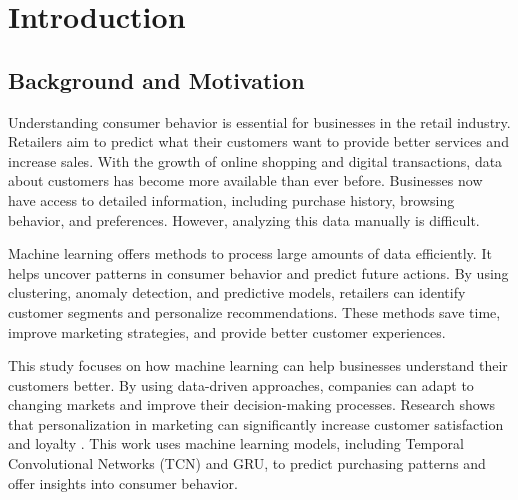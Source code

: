 \documentclass[12pt, a4paper,twoside]{report}
\theoremstyle{plain} %
\theoremstyle{definition} %
\theoremstyle{remark} %
\numberwithin{equation}{chapter}
\begin{document}
\begin{abstract}
While the research is limited by dataset size and reliance on structured data, it provides a strong foundation for future studies to explore larger datasets, unstructured data, and real-time analytics. Future work should focus on incorporating advanced models, explainable AI techniques, and longitudinal evaluations to expand the applicability of machine learning in retail decision-making. This dissertation highlights the transformative impact of data-driven strategies in modern retail and offers practical tools for businesses to stay competitive in evolving markets.
\end{abstract}


\chapter{Introduction}\label{ch:1}
\section{Background and Motivation}

Understanding consumer behavior is essential for businesses in the retail industry. Retailers aim to predict what their customers want to provide better services and increase sales. With the growth of online shopping and digital transactions, data about customers has become more available than ever before. Businesses now have access to detailed information, including purchase history, browsing behavior, and preferences. However, analyzing this data manually is difficult.

Machine learning offers methods to process large amounts of data efficiently. It helps uncover patterns in consumer behavior and predict future actions. By using clustering, anomaly detection, and predictive models, retailers can identify customer segments and personalize recommendations. These methods save time, improve marketing strategies, and provide better customer experiences.

This study focuses on how machine learning can help businesses understand their customers better. By using data-driven approaches, companies can adapt to changing markets and improve their decision-making processes. Research shows that personalization in marketing can significantly increase customer satisfaction and loyalty \citep{smith2021personalization}. This work uses machine learning models, including Temporal Convolutional Networks (TCN) and GRU, to predict purchasing patterns and offer insights into consumer behavior.
\end{document}

